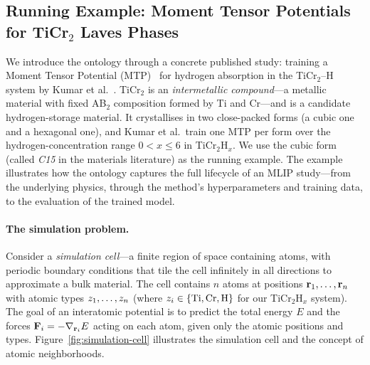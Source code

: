 \subsection{Running Example: Moment Tensor Potentials for TiCr$_2$ Laves Phases}
\label{sec:running-example}

We introduce the ontology through a concrete published study: training a
Moment Tensor Potential (MTP)~\cite{shapeev2016mtp,novikov2021mlip} for
hydrogen absorption in the TiCr$_2$--H system by Kumar et
al.~\cite{kumar2025ticr2h}. TiCr$_2$ is an \emph{intermetallic
compound}---a metallic material with fixed AB$_2$ composition formed by
Ti and Cr---and is a candidate hydrogen-storage material. It crystallises
in two close-packed forms (a cubic one and a hexagonal one), and Kumar
et al.\ train one MTP per form over the hydrogen-concentration range
$0 < x \le 6$ in TiCr$_2$H$_x$. We use the cubic form (called \emph{C15}
in the materials literature) as the running example. The example
illustrates how the ontology captures the full lifecycle of an MLIP
study---from the underlying physics, through the method's
hyperparameters and training data, to the evaluation of the trained
model.

\paragraph{The simulation problem.}
Consider a \emph{simulation cell}---a finite region of space containing
atoms, with periodic boundary conditions that tile the cell infinitely
in all directions to approximate a bulk material. The cell contains $n$
atoms at positions $\mathbf{r}_1, \ldots, \mathbf{r}_n$ with atomic types
$z_1, \ldots, z_n$ (where
$z_i \in \{\mathrm{Ti}, \mathrm{Cr}, \mathrm{H}\}$ for our
TiCr$_2$H$_x$ system). The goal of an interatomic potential is to
predict the total energy $E$ and the forces
$\mathbf{F}_i = -\nabla_{\mathbf{r}_i} E$ acting on each atom, given only
the atomic positions and types. Figure~\ref{fig:simulation-cell}
illustrates the simulation cell and the concept of atomic neighborhoods.

